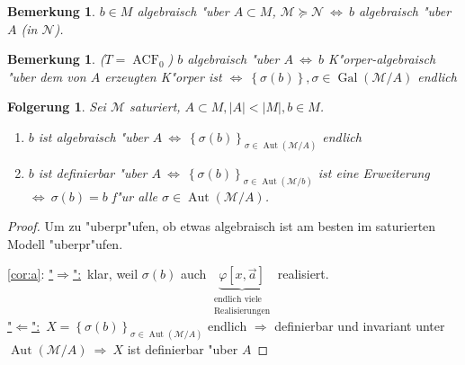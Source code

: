 \documentclass[a4paper,12pt,numbers=noenddot,parskip=full]{scrartcl}
\newcommand{\scrM}{\mathcal{M}}
\newcommand{\scrN}{\mathcal{N}}
\newcommand{\hin}{\underline{"$\Rightarrow$":}~}
\newcommand{\rueck}{\underline{"$\Leftarrow$":}~}
\DeclareMathOperator{\au}{Aut}
\DeclareMathOperator{\ga}{Gal}
\DeclareMathOperator{\acf}{ACF}
\theoremstyle{dotless}
\newtheorem{corollary}[theorem]{Folgerung}
\newtheorem{remark}[theorem]{Bemerkung}
\begin{document}
\begin{remark}
	$b \in M$ algebraisch "uber $A \subset M$, $\scrM \succeq \scrN~ \Leftrightarrow~ b$ algebraisch "uber $A$ (in $\scrN$).
\end{remark}
\begin{remark}
	($T = \acf_0$) $b$ algebraisch "uber $A~ \Leftrightarrow~b$ K"orper-algebraisch "uber dem von $A$ erzeugten K"orper ist $\Leftrightarrow~ \left\{\sigma(b)\right\}, \sigma \in \ga(\scrM/A)$ endlich
\end{remark}
\begin{corollary}
	Sei $\scrM$ saturiert, $A \subset M, |A|<|M|, b \in M$.
	\begin{enumerate}
		\item \label{cor:a}$b$ ist algebraisch "uber $A~ \Longleftrightarrow~ \left\{\sigma(b) \right\}_{\sigma \in \au(\scrM/A)}$ endlich
		\item \label{cor:b}$b$ ist definierbar "uber $A~ \Longleftrightarrow~ \left\{\sigma(b) \right\}_{\sigma \in \au(\scrM/b)}$ ist eine Erweiterung $\Longleftrightarrow~ \sigma(b) =b$ f"ur alle $\sigma \in \au(\scrM/A)$.
	\end{enumerate}
\end{corollary}
\begin{proof}
	Um zu "uberpr"ufen, ob etwas algebraisch ist am besten im saturierten Modell "uberpr"ufen.
	
	\ref{cor:a}: \hin klar, weil $\sigma(b)$ auch $\underbrace{\varphi\left[x, \vec{a}\right]}_{\substack{\text{endlich viele}\\\text{Realisierungen}}}$ realisiert.\\
	\rueck $X = \left\{\sigma(b) \right\}_{\sigma \in \au(\scrM/A)}$ endlich $\Rightarrow$ definierbar und invariant unter $\au(\scrM/A)~ \Rightarrow~ X$ ist definierbar "uber $A$
\end{proof}

\end{document}
